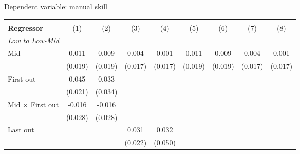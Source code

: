\begin{center}
\begin{threeparttable}[!h]
\caption{Dependent variable: manual skill}
\begin{tabular}{lcccccccc}
\toprule
\toprule
&\multicolumn{1}{c}{\textbf{}}&\multicolumn{1}{c}{\textbf{}}&\multicolumn{1}{c}{\textbf{}}&\multicolumn{1}{c}{\textbf{}}&\multicolumn{1}{c}{\textbf{}}&\multicolumn{1}{c}{\textbf{}}&\multicolumn{1}{c}{\textbf{}}&\multicolumn{1}{c}{\textbf{}} \\
\textbf{Regressor}&\multicolumn{1}{c}{(1)}&\multicolumn{1}{c}{(2)}&\multicolumn{1}{c}{(3)}&\multicolumn{1}{c}{(4)}&\multicolumn{1}{c}{(5)}&\multicolumn{1}{c}{(6)}&\multicolumn{1}{c}{(7)}&\multicolumn{1}{c}{(8)} \\
\midrule
\textit{Low to Low-Mid} \\
Mid                 &       0.011         &       0.009         &       0.004         &       0.001         &       0.011         &       0.009         &       0.004         &       0.001         \\
                    &     (0.019)         &     (0.019)         &     (0.017)         &     (0.017)         &     (0.019)         &     (0.019)         &     (0.017)         &     (0.017)         \\
First out           &       0.045\sym{*}  &       0.033         &                     &                     &                     &                     &                     &                     \\
                    &     (0.021)         &     (0.034)         &                     &                     &                     &                     &                     &                     \\
Mid $\times$ First out&      -0.016         &      -0.016         &                     &                     &                     &                     &                     &                     \\
                    &     (0.028)         &     (0.028)         &                     &                     &                     &                     &                     &                     \\
Last out            &                     &                     &       0.031         &       0.032         &                     &                     &                     &                     \\
                    &                     &                     &     (0.022)         &     (0.050)         &                     &                     &                     &                     \\

\end{tabular}
\end{threeparttable}
\end{center}
